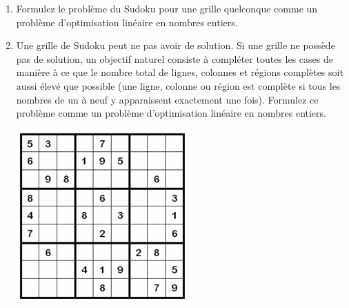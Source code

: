 \begin{enumerate}
    \begin{enumerate}

      \item Formulez le problème du Sudoku pour une grille quelconque comme un problème  d'optimisation linéaire en nombres entiers.

      \item Une grille de Sudoku peut ne pas avoir de solution. Si une grille ne possède pas de solution, un objectif naturel consiste à compléter  toutes les cases de manière à ce que le nombre total de lignes, colonnes et régions complètes soit aussi élevé que possible (une ligne, colonne ou région est complète si tous les nombres de un à neuf y apparaissent exactement une fois). Formulez ce problème comme un problème d'optimisation linéaire en nombres entiers.

        \begin{center}
          \includegraphics[scale=0.7]{sudo.jpg}
        \end{center}

    \end{enumerate}


\end{enumerate}
